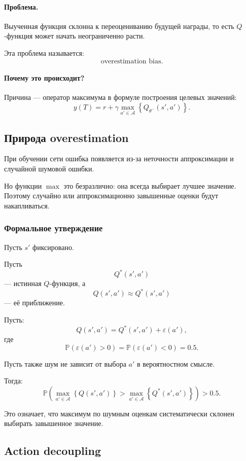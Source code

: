 \documentclass[12pt,a4paper]{article}
\begin{document}
\paragraph{Проблема.}

Выученная функция склонна к переоцениванию будущей награды, то есть $Q$-функция может начать неограниченно расти.

Эта проблема называется:
\[
\text{overestimation bias}.
\]

\paragraph{Почему это происходит?}

Причина --- оператор максимума в формуле построения целевых значений:
\[
y(T)
=
r
+
\gamma
\max_{a' \in \mathcal A}
\left\{
Q_{\theta^-}(s',a')
\right\}.
\]

\subsection{Природа overestimation}

При обучении сети ошибка появляется из-за неточности аппроксимации и случайной шумовой ошибки.

Но функции $\max$ это безразлично: она всегда выбирает лучшее значение. Поэтому случайно или аппроксимационно завышенные оценки будут накапливаться.

\subsubsection{Формальное утверждение}

Пусть $s'$ фиксировано.

Пусть
\[
Q^\ast(s',a')
\]
--- истинная $Q$-функция, а
\[
Q(s',a')
\approx
Q^\ast(s',a')
\]
--- её приближение.

Пусть:
\[
Q(s',a')
=
Q^\ast(s',a')
+
\varepsilon(a'),
\]
где
\[
\mathbb P(\varepsilon(a')>0)
=
\mathbb P(\varepsilon(a')<0)
=
0.5.
\]

Пусть также шум не зависит от выбора $a'$ в вероятностном смысле.

Тогда:
\[
\mathbb P
\left(
\max_{a' \in \mathcal A}
\left\{
Q(s',a')
\right\}
>
\max_{a' \in \mathcal A}
\left\{
Q^\ast(s',a')
\right\}
\right)
>
0.5.
\]

Это означает, что максимум по шумным оценкам систематически склонен выбирать завышенное значение.

\subsection{Action decoupling}
\end{document}
